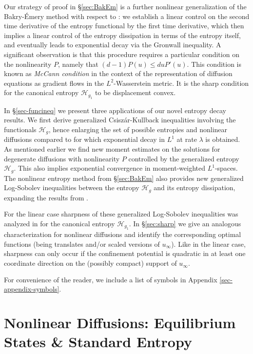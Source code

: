 \documentclass[reqno]{amsart}
\renewcommand{\H}{{\mathcal{H}}}
\begin{document}
Our strategy of proof in \S\ref{sec:BakEm} is a further nonlinear generalization of the Bakry-\'Emery method \cite{BaEm85,AMTU} with respect to \cite{CT01,otto,CJMTU}: we establish a linear control on the second time derivative of the entropy functional by the first time derivative, which then implies a linear control of the entropy dissipation in terms of the entropy itself, and eventually leads to exponential decay via the Gronwall inequality. A significant observation is that this procedure requires a particular condition on the nonlinearity $P$, namely that 
$(d-1)P(u) \leq d u P'(u)$. 
This condition is known as \emph{McCann condition} in the context of the representation of diffusion equations as gradient flows in the $L^2$-Wasserstein metric. It is the sharp condition for the canonical entropy $\H_{g_1}$ to be displacement convex. 

In \S\ref{sec-funcineq} we present three applications of our novel entropy decay results. We first derive generalized Csisz\'ar-Kullback inequalities involving the functionals $\H_g$, hence enlarging the set of possible entropies and nonlinear diffusions compared to \cite{CJMTU} for which exponential decay in $L^1$ at rate $\lambda$ is obtained. As mentioned earlier we find new moment estimates on the solutions for degenerate diffusions with nonlinearity $P$ controlled by the generalized entropy $\H_g$. This also implies exponential convergence in moment-weighted $L^1$-spaces. The nonlinear entropy method from \S\ref{sec:BakEm} also provides new generalized Log-Sobolev inequalities between the entropy $\H_g$ and its entropy dissipation, expanding the results from \cite{CJMTU,DD02}. 

For the linear case sharpness of these generalized Log-Sobolev inequalities was analyzed in \cite{AMTU} for the canonical entropy $\H_{g_1}$. In \S\ref{sec:sharp} we give an analogous characterization for nonlinear diffusions and identify the corresponding optimal functions (being translates and/or scaled versions of $u_\infty$). Like in the linear case, sharpness can only occur if the confinement potential is quadratic in at least one coordinate direction on the (possibly compact) support of $u_\infty$.
\medskip

For convenience of the reader, we include a list of symbols in Appendix \ref{sec-appendix-symbols}.


\section{Nonlinear Diffusions: Equilibrium States \& Standard Entropy}\label{sec:equilibria}
\setcounter{equation}{0}
\end{document}
